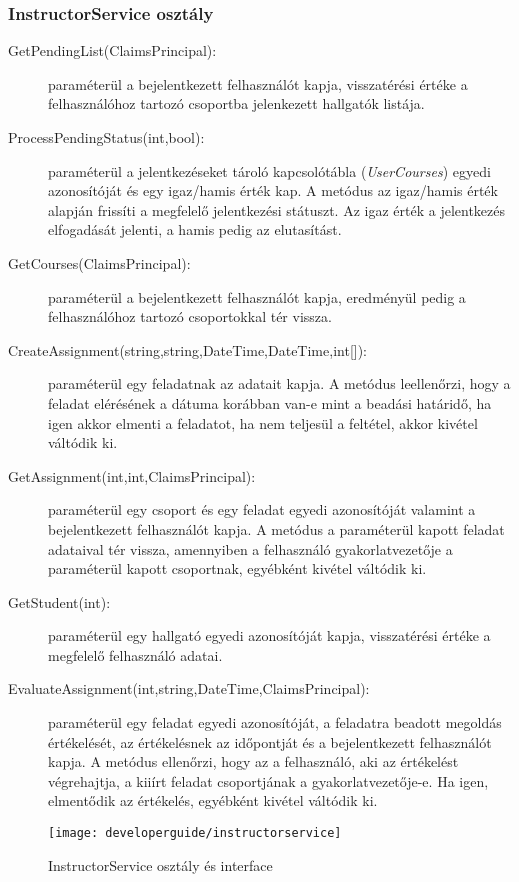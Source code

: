 \subsubsection{InstructorService osztály}
\begin{description}
	\item[GetPendingList(ClaimsPrincipal):] paraméterül a bejelentkezett felhasználót kapja, visszatérési értéke a felhasználóhoz tartozó csoportba jelenkezett hallgatók listája.
	\item[ProcessPendingStatus(int,bool):] paraméterül a jelentkezéseket tároló kapcsolótábla (\emph{UserCourses}) egyedi azonosítóját és egy igaz/hamis érték kap. A metódus az igaz/hamis érték alapján frissíti a megfelelő jelentkezési státuszt. Az igaz érték a jelentkezés elfogadását jelenti, a hamis pedig az elutasítást.
	\item[GetCourses(ClaimsPrincipal):] paraméterül a bejelentkezett felhasználót kapja, eredményül pedig a felhasználóhoz tartozó csoportokkal tér vissza.
	\item[CreateAssignment(string,string,DateTime,DateTime,int{[]}):] paraméterül egy feladatnak az adatait kapja. A metódus leellenőrzi, hogy a feladat elérésének a dátuma korábban van-e mint a beadási határidő, ha igen akkor elmenti a feladatot, ha nem teljesül a feltétel, akkor kivétel váltódik ki.
	\item[GetAssignment(int,int,ClaimsPrincipal):] paraméterül egy csoport és egy feladat egyedi azonosítóját valamint a bejelentkezett felhasználót kapja. A metódus a paraméterül kapott feladat adataival tér vissza, amennyiben a felhasználó gyakorlatvezetője a paraméterül kapott csoportnak, egyébként kivétel váltódik ki.
	\item[GetStudent(int):] paraméterül egy hallgató egyedi azonosítóját kapja, visszatérési értéke a megfelelő felhasználó adatai.
	\item[EvaluateAssignment(int,string,DateTime,ClaimsPrincipal):] paraméterül egy feladat egyedi azonosítóját, a feladatra beadott megoldás értékelését, az értékelésnek az időpontját és a bejelentkezett felhasználót kapja. A metódus ellenőrzi, hogy az a felhasználó, aki az értékelést végrehajtja, a kiiírt feladat csoportjának a gyakorlatvezetője-e. Ha igen, elmentődik az értékelés, egyébként kivétel váltódik ki.
\end{description}
\begin{figure}[H]
	\centering
	\texttt{[image: developerguide/instructorservice]}
	\caption{InstructorService osztály és interface}
	\label{fig:bll-instructorservice}
\end{figure}
